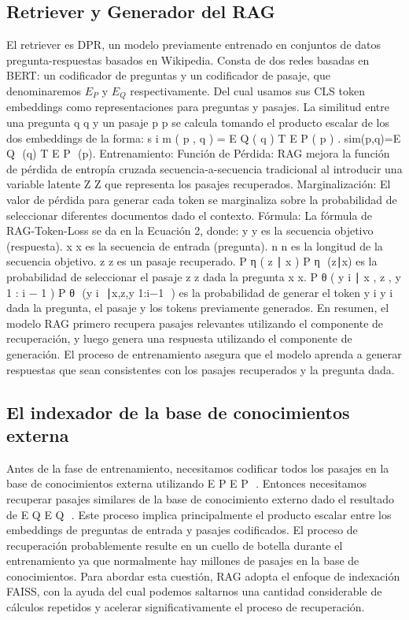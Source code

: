 \documentclass{article}
\begin{document}
\subsection{Retriever y Generador del RAG}
El retriever es DPR, un modelo previamente entrenado en conjuntos de datos pregunta-respuestas basados en Wikipedia. Consta de dos redes basadas en BERT: un codificador de preguntas y un codificador de pasaje, que denominaremos $E_P$ y $E_Q$ respectivamente. Del cual usamos sus CLS token embeddings como representaciones para preguntas y pasajes. La similitud entre una pregunta 
q
q y un pasaje 
p
p se calcula tomando el producto escalar de los dos embeddings de la forma:
s
i
m
(
p
,
q
)
=
E
Q
(
q
)
T
E
P
(
p
)
.
sim(p,q)=E 
Q
​
 (q) 
T
 E 
P
​
 (p).
Entrenamiento:
Función de Pérdida: RAG mejora la función de pérdida de entropía cruzada secuencia-a-secuencia tradicional al introducir una variable latente 
Z
Z que representa los pasajes recuperados.
Marginalización: El valor de pérdida para generar cada token se marginaliza sobre la probabilidad de seleccionar diferentes documentos dado el contexto.
Fórmula: La fórmula de RAG-Token-Loss se da en la Ecuación 2, donde:
y
y es la secuencia objetivo (respuesta).
x
x es la secuencia de entrada (pregunta).
n
n es la longitud de la secuencia objetivo.
z
z es un pasaje recuperado.
P
η
(
z
∣
x
)
P 
η
​
 (z∣x) es la probabilidad de seleccionar el pasaje 
z
z dada la pregunta 
x
x.
P
θ
(
y
i
∣
x
,
z
,
y
1
:
i
−
1
)
P 
θ
​
 (y 
i
​
 ∣x,z,y 
1:i−1
​
 ) es la probabilidad de generar el token 
y
i
y 
i
​
  dada la pregunta, el pasaje y los tokens previamente generados.
En resumen, el modelo RAG primero recupera pasajes relevantes utilizando el componente de recuperación, y luego genera una respuesta utilizando el componente de generación. El proceso de entrenamiento asegura que el modelo aprenda a generar respuestas que sean consistentes con los pasajes recuperados y la pregunta dada.
\subsection{El indexador de la base de conocimientos externa}
Antes de la fase de entrenamiento, necesitamos codificar todos los pasajes en la base de conocimientos externa utilizando 
E
P
E 
P
​
 . Entonces necesitamos recuperar pasajes similares de la base de conocimiento externo dado el resultado de 
E
Q
E 
Q
​
 . Este proceso implica principalmente el producto escalar entre los embeddings de preguntas de entrada y pasajes codificados. El proceso de recuperación probablemente resulte en un cuello de botella durante el entrenamiento ya que normalmente hay millones de pasajes en la base de conocimientos. Para abordar esta cuestión, RAG adopta el enfoque de indexación FAISS, con la ayuda del cual podemos saltarnos una cantidad considerable de cálculos repetidos y acelerar significativamente el proceso de recuperación.
\end{document}
